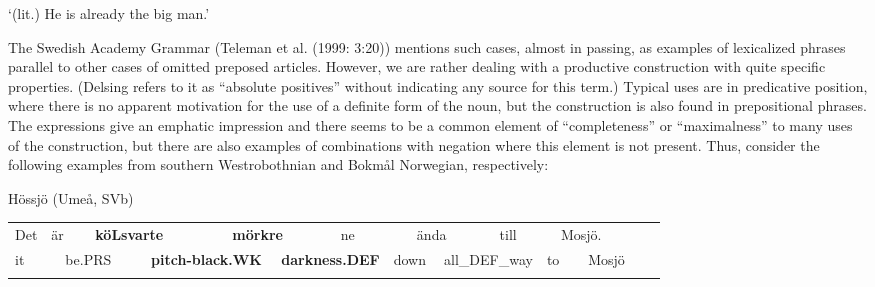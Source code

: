 \begin{styleTranslation}
‘(lit.) He is already the big man.’

\end{styleTranslation}

\begin{styleBodyTextFirst}
The Swedish Academy Grammar (Teleman et al. (1999: 3:20)) mentions such cases, almost in passing, as examples of lexicalized phrases parallel to other cases of omitted preposed articles. However, we are rather dealing with a productive construction with quite specific properties. (Delsing refers to it as “absolute positives” without indicating any source for this term.) Typical uses are in predicative position, where there is no apparent motivation for the use of a definite form of the noun, but the construction is also found in prepositional phrases. The expressions give an emphatic impression and there seems to be a common element of “completeness” or “maximalness” to many uses of the construction, but there are also examples of combinations with negation where this element is not present. Thus, consider the following examples from southern Westrobothnian and Bokmål Norwegian, respectively: 

\end{styleBodyTextFirst}

\begin{listWWNumileveli}
\item 

\begin{styleExample}
Hössjö (Umeå, SVb)

\end{styleExample}

\end{listWWNumileveli}

\begin{tabular}{llllllllllllllllll}
\lsptoprule
Det & \multicolumn{2}{l}{är

} & \multicolumn{2}{l}{{\bfseries köLsvarte}

} & \multicolumn{2}{l}{{\bfseries mörkre}

} & \multicolumn{2}{l}{ne

} & \multicolumn{2}{l}{ända

} & \multicolumn{2}{l}{till

} & \multicolumn{2}{l}{Mosjö.

} & \multicolumn{2}{l}{} & \\
\multicolumn{2}{l}{it

} & \multicolumn{2}{l}{be.PRS

} & \multicolumn{2}{l}{{\bfseries pitch-black.WK}

} & \multicolumn{2}{l}{{\bfseries darkness.DEF}

} & \multicolumn{2}{l}{down

} & \multicolumn{2}{l}{all\_DEF\_way

} & \multicolumn{2}{l}{to

} & \multicolumn{2}{l}{Mosjö

} & \multicolumn{2}{l}{}\\
\lspbottomrule
\end{tabular}


